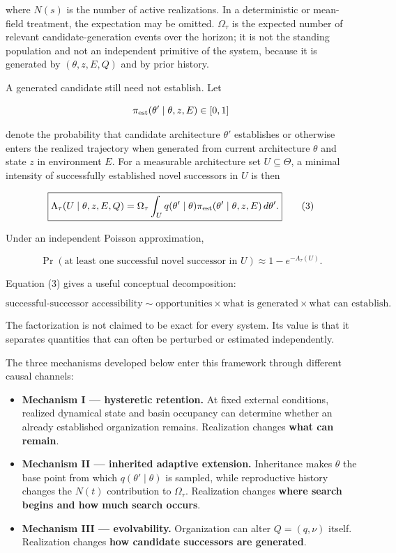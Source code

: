 \documentclass[11pt,a4paper]{article}
\providecommand{\tightlist}{%
  \setlength{\itemsep}{0pt}\setlength{\parskip}{0pt}}
\begin{document}
where \(N(s)\) is the number of active realizations. In a deterministic
or mean-field treatment, the expectation may be omitted. \(\Omega_\tau\)
is the expected number of relevant candidate-generation events over the
horizon; it is not the standing population and not an independent
primitive of the system, because it is generated by \((\theta,z,E,Q)\)
and by prior history.

A generated candidate still need not establish. Let

\[
\pi_{\rm est}(\theta'\mid\theta,z,E)\in[0,1]
\]

denote the probability that candidate architecture \(\theta'\)
establishes or otherwise enters the realized trajectory when generated
from current architecture \(\theta\) and state \(z\) in environment
\(E\). For a measurable architecture set \(U\subseteq\Theta\), a minimal
intensity of successfully established novel successors in \(U\) is then

\[
\boxed{
\Lambda_\tau(U\mid\theta,z,E,Q)
=
\Omega_\tau
\int_U
q(\theta'\mid\theta)
\pi_{\rm est}(\theta'\mid\theta,z,E)
\,d\theta'.
}
\tag{3}
\]

Under an independent Poisson approximation,

\[
\Pr(\text{at least one successful novel successor in }U)
\approx
1-e^{-\Lambda_\tau(U)}.
\tag{4}
\]

Equation (3) gives a useful conceptual decomposition:

\[
\boxed{
\text{successful-successor accessibility}
\sim
\text{opportunities}
\times
\text{what is generated}
\times
\text{what can establish}.
}
\]

The factorization is not claimed to be exact for every system. Its value
is that it separates quantities that can often be perturbed or estimated
independently.

The three mechanisms developed below enter this framework through
different causal channels:

\begin{itemize}
\tightlist
\item
  \textbf{Mechanism I --- hysteretic retention.} At fixed external
  conditions, realized dynamical state and basin occupancy can determine
  whether an already established organization remains. Realization
  changes \textbf{what can remain}.
\item
  \textbf{Mechanism II --- inherited adaptive extension.} Inheritance
  makes \(\theta\) the base point from which \(q(\theta'\mid\theta)\) is
  sampled, while reproductive history changes the \(N(t)\) contribution
  to \(\Omega_\tau\). Realization changes \textbf{where search begins
  and how much search occurs}.
\item
  \textbf{Mechanism III --- evolvability.} Organization can alter
  \(Q=(q,\nu)\) itself. Realization changes \textbf{how candidate
  successors are generated}.
\end{itemize}
\end{document}
